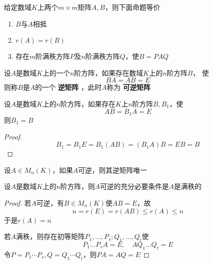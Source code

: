 \documentclass[11pt]{article}
\begin{document}
\begin{corollary}[]
给定数域\(K\)上两个\(m\times m\)矩阵\(A,B\)，则下面命题等价
\begin{enumerate}
\item \(B\)与\(A\)相抵
\item \(r(A)=r(B)\)
\item 存在\(m\)阶满秩方阵\(P\)及\(n\)阶满秩方阵\(Q\)，使\(B=PAQ\)
\end{enumerate}
\end{corollary}

\begin{definition}[]
设\(A\)是数域\(K\)上的一个\(n\)阶方阵，如果存在数域\(K\)上的\(n\)阶方阵\(B\)，
使
\begin{equation*}
BA=AB=E
\end{equation*}
则称\(B\)是\(A\)的一个 \textbf{逆矩阵} ，此时\(A\)称为 \textbf{可逆矩阵}
\end{definition}

\begin{proposition}[]
设\(A\)是数域\(K\)上的\(n\)阶方阵，如果存在\(K\)上\(n\)阶方阵\(B,B_1\)，使
\begin{equation*}
AB=B_1A=E
\end{equation*}
则\(B_1=B\)
\end{proposition}

\begin{proof}
\begin{equation*}
B_1=B_1E=B_1(AB)=(B_1A)B=EB=B
\end{equation*}
\end{proof}

\begin{corollary}[]
设\(A\in M_n(K)\)，如果\(A\)可逆，则其逆矩阵唯一
\end{corollary}

\begin{proposition}[]
设\(A\)是数域\(K\)上的\(n\)阶方阵，则\(A\)可逆的充分必要条件是\(A\)是满秩的
\end{proposition}

\begin{proof}
若\(A\)可逆，有\(B\in M_n(K)\)使\(AB=E\)，故
\begin{equation*}
n=r(E)=r(AB)\le r(A)\le n
\end{equation*}
于是\(r(A)=n\)

若\(A\)满秩，则存在初等矩阵\(P_1,\dots,P_s;Q_1,\dots,Q_t\)使
\begin{equation*}
P_1\dots P_sA=E,\quad AQ_1\dots Q_t=E
\end{equation*}
令\(P=P_1\cdots P_s,Q=Q_1\cdots Q_t\)，则\(PA=AQ=E\)
\end{proof}
\end{document}
